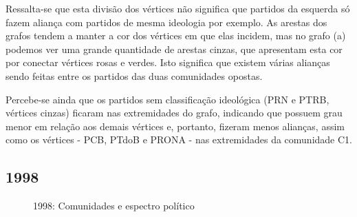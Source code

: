 Ressalta-se que esta divisão dos vértices não significa que partidos da esquerda só fazem aliança com partidos de mesma ideologia por exemplo. As arestas dos grafos tendem a manter a cor dos vértices em que elas incidem, mas no grafo (a) podemos ver uma grande quantidade de arestas cinzas, que apresentam esta cor por conectar vértices rosas e verdes. Isto significa que existem várias alianças sendo feitas entre os partidos das duas comunidades opostas.

Percebe-se ainda que os partidos sem classificação ideológica (\gls{PRN} e \gls{PTRB}, vértices cinzas) ficaram nas extremidades do grafo, indicando que possuem grau menor em relação aos demais vértices e, portanto, fizeram menos alianças, assim como os vértices - \gls{PCB}, \gls{PTdoB} e \gls{PRONA} - nas extremidades da comunidade C1.


\subsection{1998}
\label{resultados__grafos--1998}

\begin{figure}[H]
\center
    \qquad
    
    \caption{1998: Comunidades e espectro político}
\end{figure}

